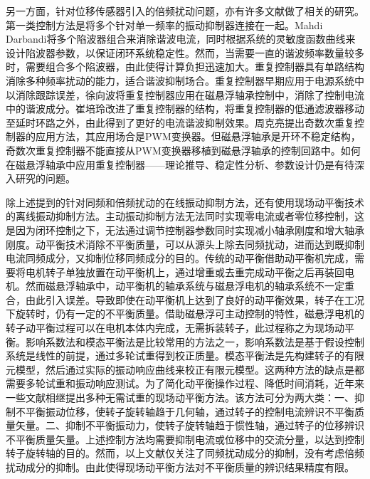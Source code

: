 \documentclass[
  lang=cn,
  degree=master,
  openany,oneside
]{nuaathesis}
\begin{document}
另一方面，针对位移传感器引入的倍频扰动问题，亦有许多文献做了相关的研究。第一类控制方法是将多个针对单一频率的振动抑制器连接在一起。Mahdi Darbandi将多个陷波器组合来消除谐波电流，同时根据系统的灵敏度函数曲线来设计陷波器参数，以保证闭环系统稳定性\cite{mahdi2017harmonic}。然而，当需要一直的谐波频率数量较多时，需要组合多个陷波器，由此使得计算负担迅速加大。重复控制器具有单路结构消除多种频率扰动的能力，适合谐波抑制场合。重复控制器早期应用于电源系统中以消除跟踪误差\cite{zhou2008plug}，徐向波将重复控制器应用在磁悬浮轴承控制中，消除了控制电流中的谐波成分\cite{xu2015model}。崔培玲改进了重复控制器的结构，将重复控制器的低通滤波器移动至延时环路之外，由此得到了更好的电流谐波抑制效果\cite{cui2016suppression}。周克亮提出奇数次重复控制器的应用方法，其应用场合是PWM变换器\cite{zhou2006zero}。但磁悬浮轴承是开环不稳定结构，奇数次重复控制器不能直接从PWM变换器移植到磁悬浮轴承的控制回路中。如何在磁悬浮轴承中应用重复控制器——理论推导、稳定性分析、参数设计仍是有待深入研究的问题。

除上述提到的针对同频和倍频扰动的在线振动抑制方法，还有使用现场动平衡技术的离线振动抑制方法。主动振动抑制方法无法同时实现零电流或者零位移控制，这是因为闭环控制之下，无法通过调节控制器参数同时实现减小轴承刚度和增大轴承刚度。动平衡技术消除不平衡质量，可以从源头上除去同频扰动，进而达到既抑制电流同频成分，又抑制位移同频成分的目的。传统的动平衡借助动平衡机完成，需要将电机转子单独放置在动平衡机上，通过增重或去重完成动平衡之后再装回电机。然而磁悬浮轴承中，动平衡机的轴承系统与磁悬浮电机的轴承系统不一定重合，由此引入误差。导致即使在动平衡机上达到了良好的动平衡效果，转子在工况下旋转时，仍有一定的不平衡质量。借助磁悬浮可主动控制的特性，磁悬浮电机的转子动平衡过程可以在电机本体内完成，无需拆装转子，此过程称之为现场动平衡。影响系数法和模态平衡法是比较常用的方法之一，影响系数法是基于假设控制系统是线性的前提，通过多轮试重得到校正质量\cite{john2009relationship,ranjan2019application}。模态平衡法是先构建转子的有限元模型，然后通过实际的振动响应曲线来校正有限元模型。这两种方法的缺点是都需要多轮试重和振动响应测试\cite{wang2014field}。为了简化动平衡操作过程、降低时间消耗，近年来一些文献相继提出多种无需试重的现场动平衡方法。该方法可分为两大类：一、抑制不平衡振动位移，使转子旋转轴趋于几何轴，通过转子的控制电流辨识不平衡质量矢量\cite{fang2013field,liu2015field}。二、抑制不平衡振动力，使转子旋转轴趋于惯性轴，通过转子的位移辨识不平衡质量矢量\cite{xu2015field}。上述控制方法均需要抑制电流或位移中的交流分量，以达到控制转子旋转轴的目的。然而，以上文献仅关注了同频扰动成分的抑制，没有考虑倍频扰动成分的抑制。由此使得现场动平衡方法对不平衡质量的辨识结果精度有限。
\end{document}
